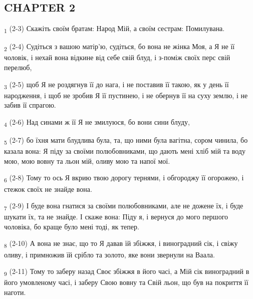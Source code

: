 \subsection{CHAPTER 2}
\begin{tcolorbox}
\textsubscript{1} (2-3) Скажіть своїм братам: Народ Мій, а своїм сестрам: Помилувана.
\end{tcolorbox}
\begin{tcolorbox}
\textsubscript{2} (2-4) Судіться з вашою матір'ю, судіться, бо вона не жінка Моя, а Я не її чоловік, і нехай вона відкине від себе свій блуд, і з-поміж своїх перс свій перелюб,
\end{tcolorbox}
\begin{tcolorbox}
\textsubscript{3} (2-5) щоб Я не роздягнув її до нага, і не поставив її такою, як у день її народження, і щоб не зробив Я її пустинею, і не обернув її на суху землю, і не забив її спрагою.
\end{tcolorbox}
\begin{tcolorbox}
\textsubscript{4} (2-6) Над синами ж її Я не змилуюся, бо вони сини блуду,
\end{tcolorbox}
\begin{tcolorbox}
\textsubscript{5} (2-7) бо їхня мати блудлива була, та, що ними була вагітна, сором чинила, бо казала вона: Я піду за своїми полюбовниками, що дають мені хліб мій та воду мою, мою вовну та льон мій, оливу мою та напої мої.
\end{tcolorbox}
\begin{tcolorbox}
\textsubscript{6} (2-8) Тому то ось Я вкрию твою дорогу тернями, і обгороджу її огорожею, і стежок своїх не знайде вона.
\end{tcolorbox}
\begin{tcolorbox}
\textsubscript{7} (2-9) І буде вона гнатися за своїми полюбовниками, але не дожене їх, і буде шукати їх, та не знайде. І скаже вона: Піду я, і вернуся до мого першого чоловіка, бо краще було мені тоді, як тепер.
\end{tcolorbox}
\begin{tcolorbox}
\textsubscript{8} (2-10) А вона не знає, що то Я давав їй збіжжя, і виноградний сік, і свіжу оливу, і примножив їй срібло та золото, яке вони звернули на Ваала.
\end{tcolorbox}
\begin{tcolorbox}
\textsubscript{9} (2-11) Тому то заберу назад Своє збіжжя в його часі, а Мій сік виноградний в його умовленому часі, і заберу Свою вовну та Свій льон, що був на покриття її наготи.
\end{tcolorbox}

